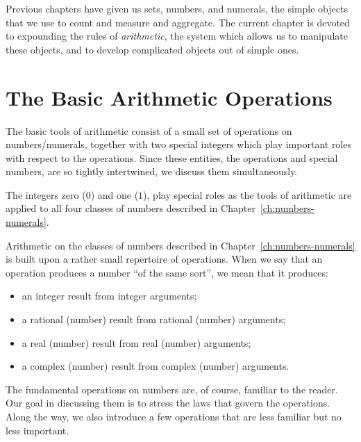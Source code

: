 \vspace*{.5in}

\noindent
Previous chapters have given us sets, numbers, and numerals, the simple objects that we use to count and measure and aggregate.  The current chapter is devoted to expounding the rules of {\em arithmetic}, the system which allows us to manipulate these objects, and to develop complicated objects out of simple ones.

\section{The Basic Arithmetic Operations}
\label{sec:Arithmetic-Tools}

The basic tools of arithmetic consist of a small set of operations on numbers/numerals, together with two special integers which play important roles with respect to the operations.  Since these entities, the operations and special numbers, are so tightly intertwined, we discuss them simultaneously.

\smallskip


 

The integers zero ($0$)  and one ($1$), play special roles as the tools of arithmetic are applied to all four classes of numbers described in Chapter~\ref{ch:numbers-numerals}.

\smallskip


Arithmetic on the classes of numbers described in Chapter~\ref{ch:numbers-numerals} is built upon a rather small repertoire of operations.  When we say that an operation produces a number ``of the same sort'', we mean that it produces:
\begin{itemize}
\item
an integer result from integer arguments;
\medskip\item
a rational (number) result from rational (number) arguments;
\medskip\item
a real (number) result from real (number) arguments;
\medskip\item
a complex (number) result from complex (number) arguments.
\end{itemize}
The fundamental operations on numbers are, of course, familiar to the reader.  Our goal in discussing them is to stress the laws that govern the operations.  Along the way, we also introduce a few operations that are less familiar but no less important.

